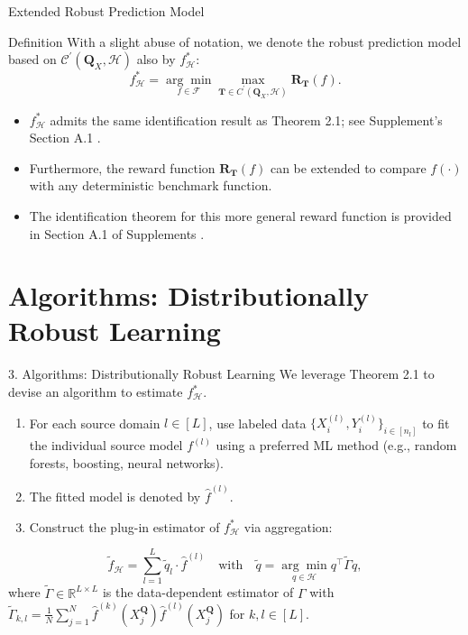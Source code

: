 \documentclass{beamer}
\begin{document}
\begin{frame}{Extended Robust Prediction Model}
    \begin{block}{Definition}
        With a slight abuse of notation, we denote the robust prediction model based on $\mathcal{C}^{\prime}(\mathbf{Q}_{X}, \mathcal{H})$ also by $f_{\mathcal{H}}^{*}$:
        \begin{equation*}
            f_{\mathcal{H}}^{*} = \underset{f \in \mathcal{F}}{\arg \min} \underset{\mathbf{T} \in C^{\prime}(\mathbf{Q}_{X}, \mathcal{H})}{\max} \mathbf{R}_{\mathbf{T}}(f).
        \end{equation*}
    \end{block}
    \begin{itemize}
        \item $f_{\mathcal{H}}^{*}$ admits the same identification result as Theorem 2.1; see Supplement's Section A.1 \cite{ref62}.
        \item Furthermore, the reward function $\mathbf{R}_{\mathbf{T}}(f)$ can be extended to compare $f(\cdot)$ with any deterministic benchmark function.
        \item The identification theorem for this more general reward function is provided in Section A.1 of Supplements \cite{ref62}.
    \end{itemize}
\end{frame}

\section{Algorithms: Distributionally Robust Learning}

\begin{frame}{3. Algorithms: Distributionally Robust Learning}
    We leverage Theorem 2.1 to devise an algorithm to estimate $f_{\mathcal{H}}^{*}$.
    \begin{enumerate}
        \item For each source domain $l \in [L]$, use labeled data $\{ X_{i}^{(l)}, Y_{i}^{(l)} \}_{i \in [n_{l}]}$ to fit the individual source model $f^{(l)}$ using a preferred ML method (e.g., random forests, boosting, neural networks).
        \item The fitted model is denoted by $\widehat{f}^{(l)}$.
        \item Construct the plug-in estimator of $f_{\mathcal{H}}^{*}$ via aggregation:
    \end{enumerate}
    \begin{equation*}
        \widetilde{f}_{\mathcal{H}} = \sum_{l = 1}^{L} \widetilde{q}_{l} \cdot \widehat{f}^{(l)} \quad \text{with} \quad \widetilde{q} = \underset{q \in \mathcal{H}}{\arg \min} q^{\intercal} \widetilde{\Gamma} q, \tag{3.1}
    \end{equation*}
    where $\widetilde{\Gamma} \in \mathbb{R}^{L \times L}$ is the data-dependent estimator of $\Gamma$ with $\widetilde{\Gamma}_{k,l} = \frac{1}{N} \sum_{j=1}^{N} \widehat{f}^{(k)} (X_{j}^{\mathbf{Q}}) \widehat{f}^{(l)} (X_{j}^{\mathbf{Q}})$ for $k, l \in [L]$.
\end{frame}
\end{document}

